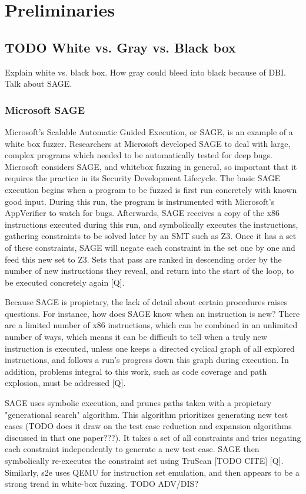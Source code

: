 \documentclass[11pt,expanded,copyright]{fsuthesis}
\begin{document}
\chapter{Preliminaries}

\section{TODO White vs. Gray vs. Black box}

Explain white vs. black box. How gray could bleed into black because of DBI. Talk about SAGE.

\subsection{Microsoft SAGE}

Microsoft's Scalable Automatic Guided Execution, or SAGE, is an example of a white box fuzzer. Researchers at Microsoft developed SAGE to deal with large, complex programs which needed to be automatically tested for deep bugs. Microsoft considers SAGE, and whitebox fuzzing in general, so important that it requires the practice in its Security Development Lifecycle. The basic SAGE execution begins when a program to be fuzzed is first run concretely with known good input. During this run, the program is instrumented with Microsoft's AppVerifier to watch for bugs. Afterwards, SAGE receives a copy of the x86 instructions executed during this run, and symbolically executes the instructions, gathering constraints to be solved later by an SMT such as Z3. Once it has a set of these constraints, SAGE will negate each constraint in the set one by one and feed this new set to Z3. Sets that pass are ranked in descending order by the number of new instructions they reveal, and return into the start of the loop, to be executed concretely again [Q].

Because SAGE is propietary, the lack of detail about certain procedures raises questions. For instance, how does SAGE know when an instruction is new? There are a limited number of x86 instructions, which can be combined in an unlimited number of ways, which means it can be difficult to tell when a truly new instruction is executed, unless one keeps a directed cyclical graph of all explored instructions, and follows a run's progress down this graph during execution. In addition, problems integral to this work, such as code coverage and path explosion, must be addressed [Q].

SAGE uses symbolic execution, and prunes paths taken with a propietary "generational search" algorithm. This algorithm prioritizes generating new test cases (TODO does it draw on the test case reduction and expansion algorithms discussed in that one paper???). It takes a set of all constraints and tries negating each constraint independently to generate a new test case. SAGE then symbolically re-executes the constraint set using TruScan [TODO CITE] [Q]. Similarly, s2e uses QEMU for instruction set emulation, and then appears to be a strong trend in white-box fuzzing. TODO ADV/DIS?
\end{document}

